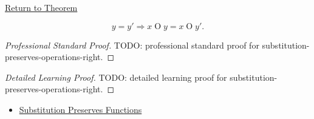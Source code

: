 \newpage
{}
\label{prf:substitution-preserves-operations-right}

\begin{remark*}[Return]
\hyperref[prop:substitution-preserves-operations-right]{Return to Theorem}
\end{remark*}

\begin{proposition*}
\[
y=y' \Longrightarrow x\mathbin{O}y=x\mathbin{O}y'.
\]
\end{proposition*}

\begin{proof}[Professional Standard Proof]
\LRAProofBodyStart
TODO: professional standard proof for substitution-preserves-operations-right.
\end{proof}

\begin{proof}[Detailed Learning Proof]
\LRAProofBodyStart
TODO: detailed learning proof for substitution-preserves-operations-right.
\end{proof}

\begin{remark*}
\end{remark*}

\begin{dependencies}
\begin{itemize}
  \item \hyperref[prop:substitution-preserves-functions]{Substitution Preserves Functions}
\end{itemize}
\end{dependencies}

\clearpage

